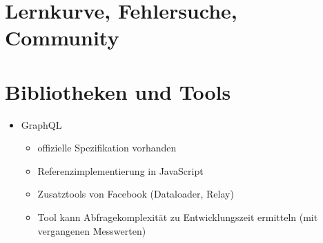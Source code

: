 \section{Lernkurve, Fehlersuche, Community}

\section{Bibliotheken und Tools}
\begin{itemize}
  \item GraphQL
  \begin{itemize}
    \item offizielle Spezifikation vorhanden
    \item Referenzimplementierung in JavaScript
    \item Zusatztools von Facebook (Dataloader, Relay)
    \item Tool kann Abfragekomplexität zu Entwicklungszeit ermitteln (mit vergangenen Messwerten)
  \end{itemize}
\end{itemize}

